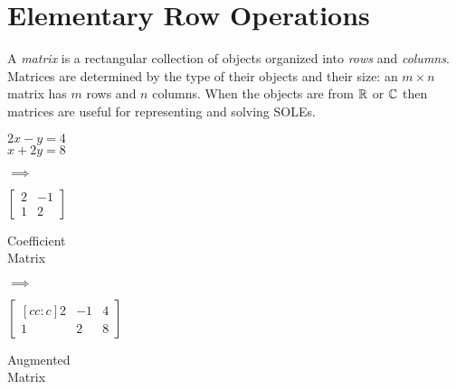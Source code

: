 \documentclass[letterpaper,12pt,fleqn]{article}
\begin{document}
\section*{Elementary Row Operations}

\begin{definition}
  A \emph{matrix} is a rectangular collection of objects organized into
  \emph{rows} and \emph{columns}. Matrices are determined by the type of their
  objects and their size: an $m\times n$ matrix has $m$ rows and $n$ columns.
  When the objects are from $\mathbb{R}$ or $\mathbb{C}$ then matrices are useful for
  representing and solving SOLEs.
\end{definition}

\begin{example}
  \begin{minipage}{1in}
    $2x-y=4$ \\
    $x+2y=8$
  \end{minipage}
  \begin{minipage}{0.5in}
    \begin{center}
      $\implies$
    \end{center}
  \end{minipage}
  \begin{minipage}[t]{0.75in}
    \begin{center}
      $\begin{bmatrix}
        2 & -1 \\
        1 & 2
      \end{bmatrix}$

      \bigskip

      Coefficient \\
      Matrix
    \end{center}
  \end{minipage}
  \begin{minipage}{0.5in}
    \begin{center}
      $\implies$
    \end{center}
  \end{minipage}
  \begin{minipage}[t]{1in}
    \begin{center}
      $\begin{bmatrix}[cc:c]
        2 & -1 & 4 \\
        1 & 2 & 8
      \end{bmatrix}$

      \bigskip

      Augmented \\
      Matrix
    \end{center}
  \end{minipage}
\end{example}
\end{document}
